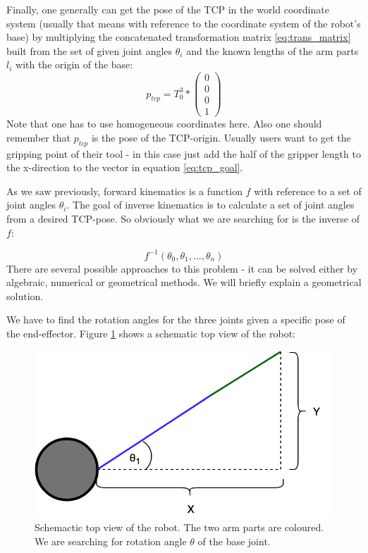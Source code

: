 \documentclass[conference]{IEEEtran}
\begin{document}
Finally, one generally can get the pose of the TCP in the world coordinate system (usually that means with reference to the coordinate system of the robot's base) by multiplying the concatenated transformation matrix \ref{eq:trans_matrix} built from the set of given joint angles $\theta_i$ and the known lengths of the arm parts $l_i$ with the origin of the base:
\begin{equation}\label{eq:tcp_goal}
p_{tcp} = T_0^3 * \begin{pmatrix}0\\0\\0\\1\end{pmatrix}
\end{equation}
Note that one has to use homogeneous coordinates here. Also one should remember that $p_{tcp}$ is the pose of the TCP-origin. Usually users want to get the gripping point of their tool - in this case just add the half of the gripper length to the x-direction to the vector in equation \ref{eq:tcp_goal}.
\\
\par

As we saw previously, forward kinematics is a function $f$ with reference to a set of joint angles $\theta_i$. The goal of inverse kinematics is to calculate a set of joint angles from a desired TCP-pose. So obviously what we are searching for is the inverse of $f$:

\begin{equation}
f^{-1}(\theta_0, \theta_1, ..., \theta_n)
\end{equation}
There are several possible approaches to this problem - it can be solved either by algebraic, numerical or geometrical methods. We will briefly explain a geometrical solution.

We have to find the rotation angles for the three joints given a specific pose of the end-effector.
Figure \ref{fig:yaw_calc} shows a schematic top view of the robot:

\begin{figure}[htbp]
	\centerline{\includegraphics[scale=0.3]{img/kin_yaw_arm_top_view.png}}
	\caption{Schemactic top view of the robot. The two arm parts are coloured. We are searching for rotation angle $\theta$ of the base joint.}
	\label{fig:yaw_calc}
\end{figure}
\end{document}
